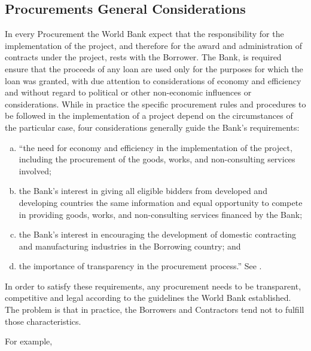 \subsection{Procurements General Considerations}

In every Procurement the World Bank expect that the responsibility for the implementation of the project, and therefore for the award and administration of contracts under the project, rests with the Borrower. The Bank, is required ensure that the proceeds of any loan are used only for the purposes for which the loan was granted, with due attention to considerations of economy and efficiency and without regard to political or other non-economic influences or considerations. While in practice the specific procurement rules and procedures to be followed in the implementation of a project depend on the circumstances of the particular case, four considerations generally guide the Bank's requirements:
\begin{enumerate}[a)]
\item ``the need for economy and efficiency in the implementation of the project, including the procurement of the goods, works, and non-consulting services involved;
\item the Bank's interest in giving all eligible bidders from developed and developing countries the same information and equal opportunity to compete in providing goods, works, and non-consulting services financed by the Bank;
\item  the Bank's interest in encouraging the development of domestic contracting and manufacturing industries in the Borrowing country; and
\item the importance of transparency in the procurement process.'' See \cite{wb_g_proc}.
\end{enumerate}

In order to satisfy these requirements, any procurement needs to be transparent, competitive and legal according to the guidelines the World Bank established. The problem is that in practice, the Borrowers and Contractors tend not to fulfill those characteristics.

For example, 

